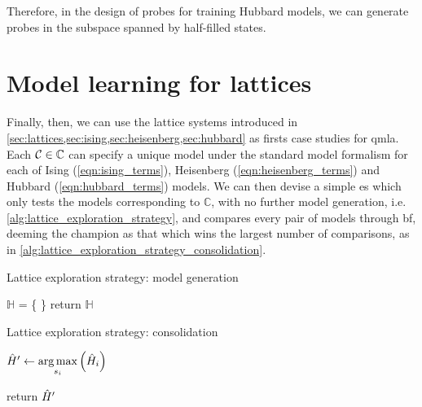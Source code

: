 Therefore, in the design of probes for training Hubbard models, 
    we can generate probes in the subspace spanned by half-filled states. 

\section{Model learning for lattices}
Finally, then, we can use the lattice systems introduced in \cref{sec:lattices,sec:ising,sec:heisenberg,sec:hubbard}
    as firsts case studies for \gls{qmla}. 
Each ${ \mathcal{C}} \in \mathbb{C}$ can specify a unique model under the standard model formalism
    for each of Ising (\cref{eqn:ising_terms}), Heisenberg (\cref{eqn:heisenberg_terms}) 
    and Hubbard (\cref{eqn:hubbard_terms}) models.     
We can then devise a simple \gls{es} which only tests the models corresponding to $\mathbb{C}$, 
    with no further model generation, i.e. \cref{alg:lattice_exploration_strategy}, 
    and compares every pair of models through \gls{bf}, 
    deeming the champion as that which wins the largest number of comparisons, 
    as in \cref{alg:lattice_exploration_strategy_consolidation}.

\begin{algorithm}
    \caption{Lattice exploration strategy: model generation}
    \label{alg:lattice_exploration_strategy}
    \DontPrintSemicolon

    \;

    $\mathbb{H}$ = \{ \}\;
    return $\mathbb{H}$
\end{algorithm}

\begin{algorithm}
    \caption{Lattice exploration strategy: consolidation}
    \label{alg:lattice_exploration_strategy_consolidation}
    \DontPrintSemicolon

    \;


    $\hat{H}^{\prime} \gets \operatorname*{arg\,max}\limits_{s_i} \left(\hat{H}_i\right)$

    return $\hat{H}^{\prime}$
\end{algorithm}



